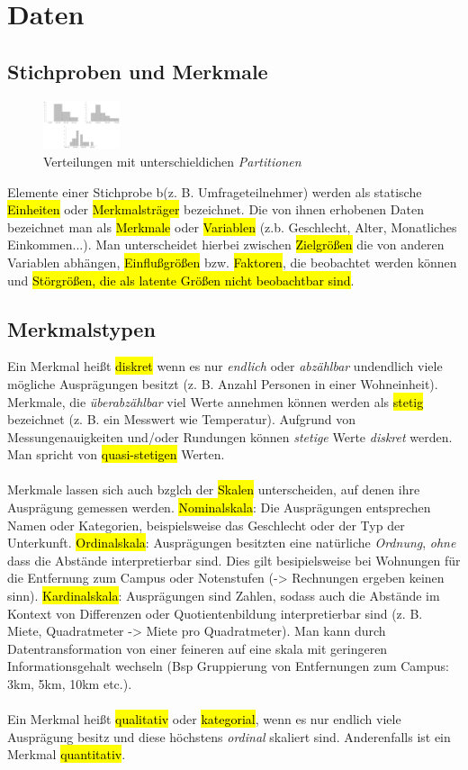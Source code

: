 \section{Daten}
\subsection{Stichproben und Merkmale}
\begin{figure}
    \centering
    \includegraphics[width=0.2\textwidth]{images/2.2_histogramme.png}
    \caption{Verteilungen mit unterschieldichen \emph{Partitionen}}
    \label{fig:histogramme-binning}
    
\end{figure}
Elemente einer Stichprobe b(z. B. Umfrageteilnehmer) werden als statische \hl{Einheiten} oder \hl{Merkmalsträger} bezeichnet.
Die von ihnen erhobenen Daten bezeichnet man als \hl{Merkmale} oder \hl{Variablen} (z.b. Geschlecht, Alter, Monatliches Einkommen...). 
Man unterscheidet hierbei zwischen \hl{Zielgrößen} die von anderen Variablen abhängen, \hl{Einflußgrößen} bzw. \hl{Faktoren}, die beobachtet werden können und \hl{Störgrößen, die als latente Größen nicht beobachtbar sind}.
\subsection{Merkmalstypen}
Ein Merkmal heißt \hl{diskret} wenn es nur \emph{endlich} oder \emph{abzählbar} undendlich viele mögliche Ausprägungen besitzt (z. B. Anzahl Personen in einer Wohneinheit). Merkmale, die \emph{überabzählbar} viel Werte annehmen können werden als \hl{stetig}  bezeichnet (z. B. ein Messwert wie Temperatur). Aufgrund von Messungenauigkeiten und/oder Rundungen können \emph{stetige} Werte \emph{diskret} werden. Man spricht von \hl{quasi-stetigen} Werten. 
\\\\
Merkmale lassen sich auch bzglch der \hl{Skalen} unterscheiden, auf denen ihre Ausprägung gemessen werden. \hl{Nominalskala}: Die Ausprägungen entsprechen Namen oder Kategorien, beispielsweise das Geschlecht oder der Typ der Unterkunft. \hl{Ordinalskala}: Ausprägungen besitzten eine natürliche \emph{Ordnung}, \emph{ohne} dass
die Abstände interpretierbar sind. Dies gilt besipielsweise bei Wohnungen für die Entfernung zum Campus oder Notenstufen (-> Rechnungen ergeben keinen sinn). 
\hl{Kardinalskala}: Ausprägungen sind Zahlen, sodass auch die Abstände im Kontext von Differenzen oder Quotientenbildung interpretierbar sind (z. B. Miete, Quadratmeter -> Miete pro Quadratmeter).
Man kann durch Datentransformation von einer feineren auf eine skala mit geringeren Informationsgehalt wechseln (Bsp Gruppierung von Entfernungen zum Campus: 3km, 5km, 10km etc.).
\\\\
Ein Merkmal heißt \hl{qualitativ} oder \hl{kategorial}, wenn es nur endlich viele Ausprägung besitz und diese höchstens \emph{ordinal} skaliert sind.
Anderenfalls ist ein Merkmal \hl{quantitativ}.
